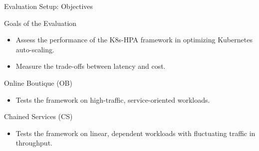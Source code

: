 \documentclass{beamer}
\begin{document}
\begin{frame}{Evaluation Setup: Objectives}
    \begin{block}{Goals of the Evaluation}
        \begin{itemize}
            \item Assess the performance of the K8s-HPA framework in optimizing Kubernetes auto-scaling.
            \item Measure the trade-offs between latency and cost.
        \end{itemize}
    \end{block}
    \begin{block}{Online Boutique (OB)}
        \begin{itemize}
            \item Tests the framework on high-traffic, service-oriented workloads.
        \end{itemize}
    \end{block}
    \begin{block}{Chained Services (CS)}
        \begin{itemize}
            \item Tests the framework on linear, dependent workloads with fluctuating traffic in throughput.
        \end{itemize}
    \end{block}
\end{frame}
\end{document}
